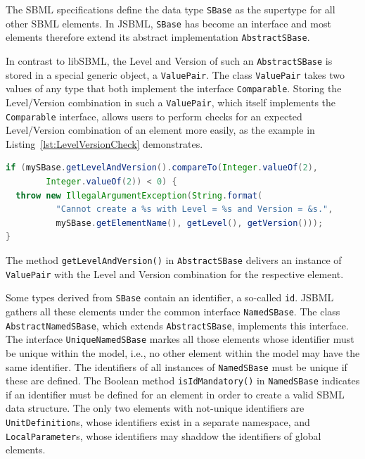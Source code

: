 The SBML specifications define the data type
\texttt{SBase} as the
supertype for all other SBML elements. In JSBML, \texttt{SBase} has become an
interface and most elements therefore extend its abstract implementation
\texttt{AbstractSBase}.

In contrast to libSBML, the Level and Version of such an \texttt{AbstractSBase}
is stored in a special generic object, a \texttt{ValuePair}.
%
The class \texttt{ValuePair} takes two values of any type that both implement
the interface \texttt{Comparable}.
%
Storing the Level/Version combination in such a \texttt{ValuePair}, which itself
implements the \texttt{Comparable} interface, allows users to perform checks for
an expected Level/Version combination of an element more easily, as the example
in Listing~\vref{lst:LevelVersionCheck} demonstrates.
\begin{lstlisting}[language=Java,float=h,caption={Check for a minimal expected Level/Version combination},label={lst:LevelVersionCheck}]
if (mySBase.getLevelAndVersion().compareTo(Integer.valueOf(2),
        Integer.valueOf(2)) < 0) {
  throw new IllegalArgumentException(String.format(
          "Cannot create a %s with Level = %s and Version = &s.",
          mySBase.getElementName(), getLevel(), getVersion()));
}
\end{lstlisting}
The method \texttt{getLevelAndVersion()} in \texttt{AbstractSBase}
%
delivers an instance of \texttt{ValuePair}
%
with the Level and Version combination for the respective element.

Some types derived from \texttt{SBase} contain an identifier, a so-called
\texttt{id}. JSBML gathers all these elements under the common interface
\texttt{NamedSBase}. The class \texttt{AbstractNamedSBase}, which extends
\texttt{AbstractSBase}, implements this interface.
%
%
The interface \texttt{UniqueNamedSBase} markes all those elements whose
identifier must be unique within the model, i.e., no other element within the
model may have the same identifier. The identifiers of all instances of
\texttt{NamedSBase} must be unique if these are defined. The Boolean method
\texttt{isIdMandatory()} in \texttt{NamedSBase} indicates if an identifier must
be defined for an element in order to create a valid SBML data structure. The
only two elements with not-unique identifiers are
\texttt{UnitDefinition}s,
whose identifiers exist in a separate namespace, and
\texttt{LocalParameter}s,
whose identifiers may shaddow the identifiers of global elements.

